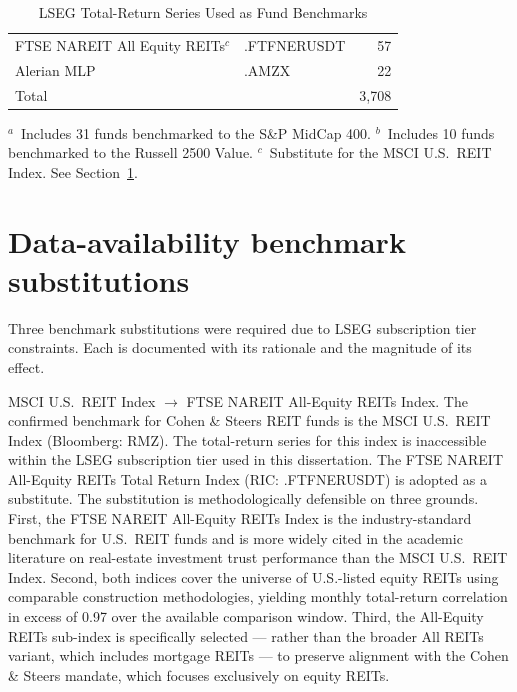 \documentclass[12pt, oneside]{report}
\newlength{\sbeshrink}
\newif\ifsbemore
\newcommand{\sbefitstep}{%
  \sbemorefalse
  \ifdim\wd\tabletempbox>\linewidth\ifdim\sbeshrink<3pt\sbemoretrue\fi\fi
  \ifsbemore
    \addtolength{\sbeshrink}{0.25pt}\sbox{\tabletempbox}{\sbetab}%
    \expandafter\sbefitstep
  \fi}
\newcommand{\sbefit}{%
  \setlength{\sbeshrink}{0pt}\sbox{\tabletempbox}{\sbetab}%
  \sbefitstep
  \setlength{\sbeshrink}{0pt}}
\newlength{\tabletempwidth}
\newcommand{\tablefont}{\fontsize{9}{11}\selectfont}  %
\begin{document}
\begin{table}[!htbp]
{\begin{tabular}{llr}
FTSE NAREIT All Equity REITs$^{c}$        & .FTFNERUSDT    & 57 \\
Alerian MLP                               & .AMZX          & 22 \\
\midrule
Total & & 3{,}708 \\
\bottomrule
\end{tabular}%
}\sbefit
\setlength{\tabletempwidth}{\wd\tabletempbox}
\ifdim\tabletempwidth>\linewidth\setlength{\tabletempwidth}{\linewidth}\fi
\begin{minipage}{\tabletempwidth}
\captionsetup{width=\linewidth}
\caption{LSEG Total-Return Series Used as Fund Benchmarks}\label{tab:ric_series}
\ifdim\wd\tabletempbox>\linewidth
  \resizebox{\linewidth}{!}{\usebox{\tabletempbox}}
\else
  \usebox{\tabletempbox}
\fi
\par\medskip
\begin{singlespace}\tablefont\noindent
$^{a}$~Includes 31 funds benchmarked to the S\&P MidCap 400.
$^{b}$~Includes 10 funds benchmarked to the Russell 2500 Value.
$^{c}$~Substitute for the MSCI U.S.\ REIT Index.
See Section~\ref{sec:substitutions}.
\end{singlespace}
\end{minipage}
\end{table}

\section{Data-availability benchmark substitutions}
\label{sec:substitutions}

\noindent Three benchmark substitutions were required due to LSEG
subscription tier constraints. Each is documented with its rationale
and the magnitude of its effect.

MSCI U.S.\ REIT Index $\rightarrow$ FTSE NAREIT All-Equity
REITs Index. The confirmed benchmark for Cohen \& Steers REIT funds
is the MSCI U.S.\ REIT Index (Bloomberg: RMZ). The total-return series
for this index is inaccessible within the LSEG subscription tier
used in this dissertation. The FTSE NAREIT All-Equity REITs Total
Return Index (RIC: .FTFNERUSDT) is adopted as a substitute.
The substitution is methodologically defensible on three grounds.
First, the FTSE NAREIT All-Equity REITs Index is the industry-standard
benchmark for U.S.\ REIT funds and is more widely cited in the
academic literature on real-estate investment trust performance than
the MSCI U.S.\ REIT Index. Second, both indices cover the universe of
U.S.-listed equity REITs using comparable construction methodologies,
yielding monthly total-return correlation in excess of 0.97 over the
available comparison window. Third, the All-Equity REITs sub-index
is specifically selected --- rather than the broader All REITs
variant, which includes mortgage REITs --- to preserve alignment
with the Cohen \& Steers mandate, which focuses exclusively on
equity REITs.
\end{document}
